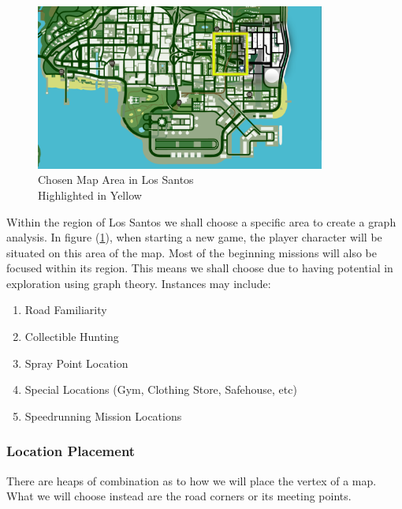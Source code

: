 \documentclass{article}
\begin{document}
	\clearpage
	\begin{figure}[!h]
			\centering
			\includegraphics[width=0.85\textwidth]{./0img/gtaMap.png}
			\caption{Chosen Map Area in Los Santos \\ Highlighted in Yellow}
			\label{ls_map}
	\end{figure} Within the region of Los Santos we shall choose a specific area to create a graph analysis. In figure (\ref{ls_map}), when starting a new game, the player character will be situated on this area of the map. Most of the beginning missions will also be focused within its region. This means we shall choose due to having potential in exploration using graph theory. Instances may include:
	\begin{enumerate}
		\item Road Familiarity
		\item Collectible Hunting
		\item Spray Point Location
		\item Special Locations (Gym, Clothing Store, Safehouse, etc)
		\item Speedrunning Mission Locations
	\end{enumerate}
	
	\clearpage
	\subsubsection*{Location Placement}
	There are heaps of combination as to how we will place the vertex of a map. What we will choose instead are the road corners or its meeting points.
	
\end{document}
